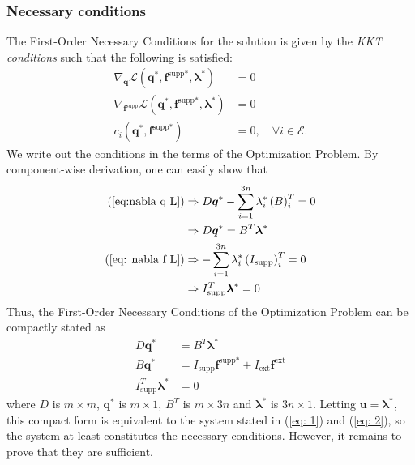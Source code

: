\documentclass[10pt,a4paper]{article}
\begin{document}
\subsubsection{Necessary conditions}
The First-Order Necessary Conditions for the solution is given by the \textit{KKT conditions} such that the following is satisfied:
\begin{align}
\nabla_{\boldsymbol{q}}\mathcal{L}\left(\boldsymbol{q}^*,\boldsymbol{f}^\text{supp*},\boldsymbol{\lambda}^*\right) &= 0 \label{eq:nabla q L} \\
\nabla_{\boldsymbol{f}^\text{supp}}\mathcal{L}\left(\boldsymbol{q}^*,\boldsymbol{f}^\text{supp*},\boldsymbol{\lambda}^*\right) &= 0 \label{eq: nabla f L} \\
c_i\left(\boldsymbol{q}^*,\boldsymbol{f}^\text{supp*}\right) &= 0, \quad \forall i \in \mathcal{E}. \label{eq: ci=0 all i in E}
\end{align}
We write out the conditions in the terms of the Optimization Problem. \linebreak By component-wise derivation, one can easily show that
\begin{align*}
\left(\ref{eq:nabla q L}\right) &\Rightarrow D\boldsymbol{q}^* - \sum_{i=1}^{3n}\lambda_i^*\left(B\right)_i^T = 0 \\
 &\Rightarrow D\boldsymbol{q}^* = B^T\boldsymbol{\lambda}^* \\
\left(\ref{eq: nabla f L}\right) &\Rightarrow -\sum_{i=1}^{3n}\lambda_i^*\left(I_\text{supp}\right)_i^T = 0 \\
 &\Rightarrow I_\text{supp}^T\boldsymbol{\lambda}^* = 0
\end{align*}
Thus, the First-Order Necessary Conditions of the Optimization Problem can be compactly stated as 
\begin{align*}
D\boldsymbol{q}^* &= B^T\boldsymbol{\lambda}^* \\
B\boldsymbol{q}^* &= I_\text{supp}\boldsymbol{f}^\text{supp*} + I_\text{ext}\boldsymbol{f}^\text{ext}\\
I_\text{supp}^T\boldsymbol{\lambda}^* &= 0
\end{align*} 
where $D$ is $m\times m$, $\boldsymbol{q}^*$ is $m\times 1$, $B^T$ is $m\times 3n$ and $\boldsymbol{\lambda}^*$ is $3n \times 1$. Letting $\boldsymbol{u} = \boldsymbol{\lambda}^*$, this compact form is equivalent to the system stated in (\ref{eq: 1}) and (\ref{eq: 2}), so the system at least constitutes the necessary conditions. However, it remains to prove that they are sufficient.
\end{document}
